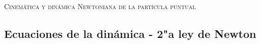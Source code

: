 \documentclass[11pt, spanish, a4paper, twopage]{article}
\begin{document}
\begin{center}
  \textsc{\large Cinemática y dinámica Newtoniana de la partícula puntual}
\end{center}

\begin{enumerate}


\section*{Ecuaciones de la dinámica - 2"a ley de Newton}



\end{enumerate}
\end{document}
